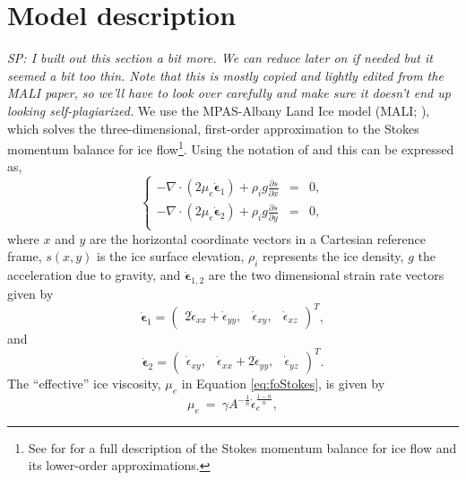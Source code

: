 \documentclass[review,oneside]{igs}
\begin{document}
\section{Model description}
\textit{SP: I built out this section a bit more. We can reduce later on if needed but it seemed a bit too thin. Note that this is mostly copied and lightly edited from the MALI paper, so we'll have to look over carefully and make sure it doesn't end up looking self-plagiarized.}
We use the MPAS-Albany Land Ice model (MALI; \cite{hoffman2018}), which solves the three-dimensional, first-order approximation to the Stokes momentum balance for ice flow\footnote{See \citet{schoof2013} for for a full description of the Stokes momentum balance for ice flow and its lower-order approximations.}. Using the notation  of \cite{perego2012} and \citet{tezaur2015a} this can be expressed as, 
\begin{equation} \label{eq:foStokes}
\left\{
\begin{array}{rcl} -\nabla \cdot (2 \mu_e \dot{\boldsymbol{\epsilon}}_1) + \rho_{i} g
\frac{\partial s}{\partial x}&=&0, \\
-\nabla \cdot (2 \mu_e \dot{\boldsymbol{\epsilon}}_2) +\rho_{i} g
\frac{\partial s}{\partial y} &=& 0, \\
\end{array}\right.
\end{equation}
where $x$ and $y$ are the horizontal coordinate vectors in a Cartesian reference frame, $s(x,y)$ is the ice surface elevation, $\rho_{i}$ represents the ice density, $g$ the acceleration due to gravity, and $\dot{\boldsymbol{\epsilon}}_{1,2}$ are the two dimensional strain rate vectors given by
\begin{equation}
\dot{\boldsymbol{\epsilon}}_1 = \left(\begin{array}{ccc}
2\dot{\epsilon}_{xx} + \dot{\epsilon}_{yy}, &\dot{\epsilon}_{xy},&
\dot{\epsilon}_{xz}\end{array}\right)^T,
\end{equation}
and
\begin{equation}
\dot{\boldsymbol{\epsilon}}_2 = \left(
\begin{array}{ccc}\dot{\epsilon}_{xy}, &
\dot{\epsilon}_{xx} + 2\dot{\epsilon}_{yy}, &\dot{\epsilon}_{yz}
\end{array}\right)^T.
\end{equation}
The ``effective'' ice viscosity, $ \mu_e$ in Equation \ref{eq:foStokes}, is given by 
\begin{equation}
\label{eq:effvisc}
    \mu_{e}~=~\gamma A^{-\frac{1}{n}}\dot{\epsilon}_{e}^{\frac{1-n}{n}},
\end{equation}
\end{document}
